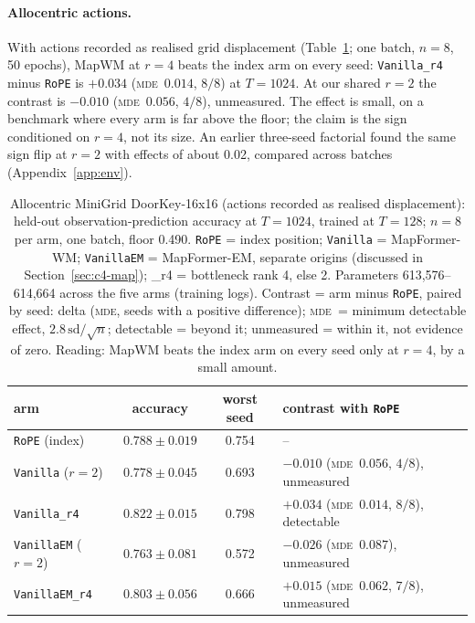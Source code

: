 \documentclass[10pt]{article}
\newcommand{\mde}{\textsc{mde}}
\newcommand{\arm}[1]{\texttt{#1}}
\begin{document}
\paragraph{Allocentric actions.} With actions recorded as realised grid displacement
(Table~\ref{tab:minigrid-allo}; one batch, $n=8$, 50 epochs), MapWM at $r=4$ beats the index arm on
every seed: \arm{Vanilla\_r4} minus \arm{RoPE} is $+0.034$ (\mde\ $0.014$, $8/8$) at $T=1024$. At our
shared $r=2$ the contrast is $-0.010$ (\mde\ $0.056$, $4/8$), unmeasured. The effect is small, on a
benchmark where every arm is far above the floor; the claim is the sign conditioned on $r=4$, not its
size. An earlier three-seed factorial found the same sign flip at $r=2$ with effects of about 0.02,
compared across batches (Appendix~\ref{app:env}). %

\begin{table}[t]
\centering
\small
\captionsetup{font=footnotesize,skip=4pt}
\caption{Allocentric MiniGrid DoorKey-16x16 (actions recorded as realised displacement): held-out observation-prediction accuracy at $T=1024$, trained at $T=128$; $n=8$ per arm, one batch, floor 0.490. \arm{RoPE} = index position; \arm{Vanilla} = MapFormer-WM; \arm{VanillaEM} = MapFormer-EM, separate origins (discussed in Section~\ref{sec:c4-map}); \_r4 = bottleneck rank 4, else 2. Parameters 613,576--614,664 across the five arms (training logs). Contrast = arm minus \arm{RoPE}, paired by seed: delta (\mde, seeds with a positive difference); \mde\ = minimum detectable effect, $2.8\,\mathrm{sd}/\sqrt{n}$; detectable = beyond it; unmeasured = within it, not evidence of zero. Reading: MapWM beats the index arm on every seed only at $r=4$, by a small amount.}
\label{tab:minigrid-allo}
\begin{tabular}{@{}lccl@{}}
\toprule
arm & accuracy & worst seed & contrast with \arm{RoPE} \\
\midrule
\arm{RoPE} (index)       & $0.788\pm0.019$ & 0.754 & -- \\
\arm{Vanilla} ($r=2$)    & $0.778\pm0.045$ & 0.693 & $-0.010$ (\mde\ $0.056$, $4/8$), unmeasured \\
\arm{Vanilla\_r4}        & $0.822\pm0.015$ & 0.798 & $+0.034$ (\mde\ $0.014$, $8/8$), detectable \\
\arm{VanillaEM} ($r=2$)  & $0.763\pm0.081$ & 0.572 & $-0.026$ (\mde\ $0.087$), unmeasured \\
\arm{VanillaEM\_r4}      & $0.803\pm0.056$ & 0.666 & $+0.015$ (\mde\ $0.062$, $7/8$), unmeasured \\
\bottomrule
\end{tabular}
\end{table}
\end{document}
